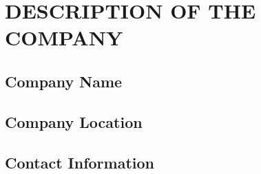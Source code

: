 \chapter{DESCRIPTION OF THE COMPANY}

\section{Company Name}

\section{Company Location}

\section{Contact Information}
